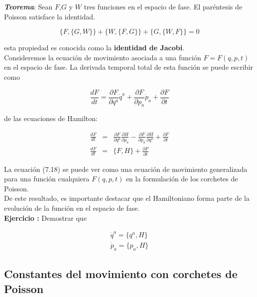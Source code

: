 \documentclass[12pt]{report}
\begin{document}
\textbf{\textit{Teorema}}: Sean $F$,$G$ y $W$ tres funciones en el espacio de fase. El paréntesis de Poisson satisface la identidad.

\begin{equation}
\{F,\{G,W\}\}+ \{W,\{F,G\}\} + \{G,\{W,F\}\}=0 
\end{equation}

esta propiedad es conocida como la \textbf{identidad de Jacobi}. \\ 

Consideremos la ecuación de movimiento asociada a una función $F=F(q,p,t)$ en el espacio de fase. La derivada temporal total de esta función se puede escribir como


\begin{equation}
\frac{dF}{dt} = \frac{\partial F}{\partial q^a}\dot{q}^a+ \frac{\partial F}{\partial p_a}\dot{p}_a + \frac{\partial F}{\partial t}
\end{equation}

de las ecuaciones de Hamilton: 

\begin{eqnarray}
\frac{dF}{dt} &=& \frac{\partial F}{\partial q^a}\frac{\partial H}{\partial p_a}- \frac{\partial F}{\partial p_a}\frac{\partial H}{\partial q^a} + \frac{\partial F}{\partial t} \\
\frac{dF}{dt}&=& \{ F,H \} + \frac{\partial F}{\partial t}
\end{eqnarray}

La ecuación (7.18) se puede ver como una ecuación de movimiento generalizada para una función cualquiera $F(q,p,t)$ en la formulación de los corchetes de Poisson. \\

De este resultado, es importante destacar que el Hamiltoniano forma parte de la evolución de la función en el espacio de fase. \\



\textbf{Ejercicio :} Demostrar que 

\begin{eqnarray}
\dot{q}^a = \{ q^a,H\} \\
\dot{p}_a=\{p_a,H\}
\end{eqnarray}


\subsection{Constantes del movimiento con corchetes de Poisson }
\end{document}
